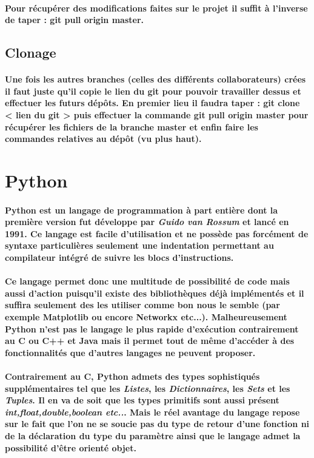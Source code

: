 \documentclass[a4paper, 12pt, twoside]{article}
\begin{document}
\paragraph{Pour récupérer des modifications faites sur le projet il suffit à l'inverse de taper : 
 git pull origin master.}
\subsection{Clonage}
\paragraph{Une fois les autres branches (celles des différents collaborateurs) crées il faut juste qu'il copie le lien du git pour pouvoir 
travailler dessus et effectuer les futurs dépôts. En premier lieu il faudra taper :  git clone < lien du git >  puis effectuer la commande
 git pull origin master  pour récupérer les fichiers de la branche master et enfin faire les commandes relatives au dépôt (vu plus haut).}



\section{Python}
\paragraph{Python est un langage de programmation à part entière dont la première version fut développe par \textit{Guido van Rossum} et lancé en 1991. Ce langage est facile d'utilisation et ne possède pas forcément de syntaxe particulières seulement une indentation   permettant au compilateur intégré de suivre les blocs d'instructions.}
\paragraph{Ce langage permet donc une multitude de possibilité de code mais aussi d'action puisqu'il existe des bibliothèques déjà implémentés et il suffira seulement des les utiliser comme bon nous le semble (par exemple Matplotlib ou encore Networkx etc...). Malheureusement Python n'est pas le langage le plus rapide d'exécution contrairement au C ou C++ et Java mais il permet tout de même d'accéder à des fonctionnalités que d'autres langages ne peuvent proposer.}
\paragraph{Contrairement au C, Python admets des types sophistiqués supplémentaires tel que les \textit{Listes}, les \textit{Dictionnaires}, les \textit{Sets} et les \textit{Tuples}. Il en va de soit que les types primitifs sont aussi présent \textit{int,float,double,boolean etc..}. Mais le réel avantage du langage repose sur le fait que l'on ne se soucie pas du type de retour d'une fonction ni de la déclaration du type du paramètre ainsi que le langage admet la possibilité d'être orienté objet.}
\end{document}
